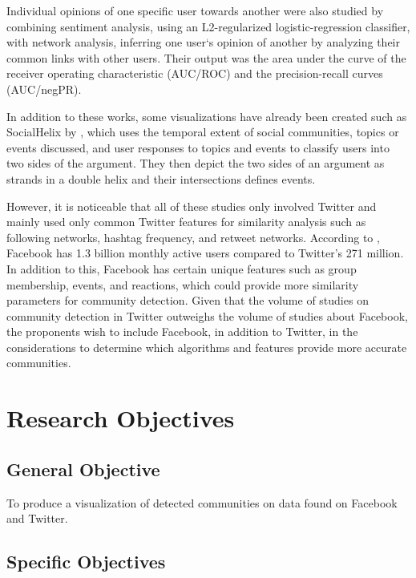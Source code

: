 Individual opinions of one specific user towards another were also studied by  combining sentiment analysis, using an L2-regularized logistic-regression classifier, with network analysis, inferring one user`s opinion of another by analyzing their common links with other users. Their output was the area under the curve of the receiver operating characteristic (AUC/ROC) and the precision-recall curves (AUC/negPR). 

In addition to these works, some visualizations have already been created such as SocialHelix by , which uses the temporal extent of social communities, topics or events discussed, and user responses to topics and events to classify users into two sides of the argument. They then depict the two sides of an argument as strands in a double helix and their intersections defines events.

However, it is noticeable that all of these studies only involved Twitter and mainly used only common Twitter features for similarity analysis such as following networks, hashtag frequency, and retweet networks. According to , Facebook has 1.3 billion monthly active users compared to Twitter's 271 million. In addition to this, Facebook has certain unique features such as group membership, events, and reactions, which could provide more similarity parameters for community detection. Given that the volume of studies on community detection in Twitter outweighs the volume of studies about Facebook, the proponents wish to include Facebook, in addition to Twitter, in the considerations to determine which algorithms and features provide more accurate communities.

\section{Research Objectives}
\label{sec:researchobjectives}

\subsection{General Objective}
\label{sec:generalobjective}

To produce a visualization of detected communities on data found on Facebook and Twitter.

\subsection{Specific Objectives}
\label{sec:specificobjectives}

